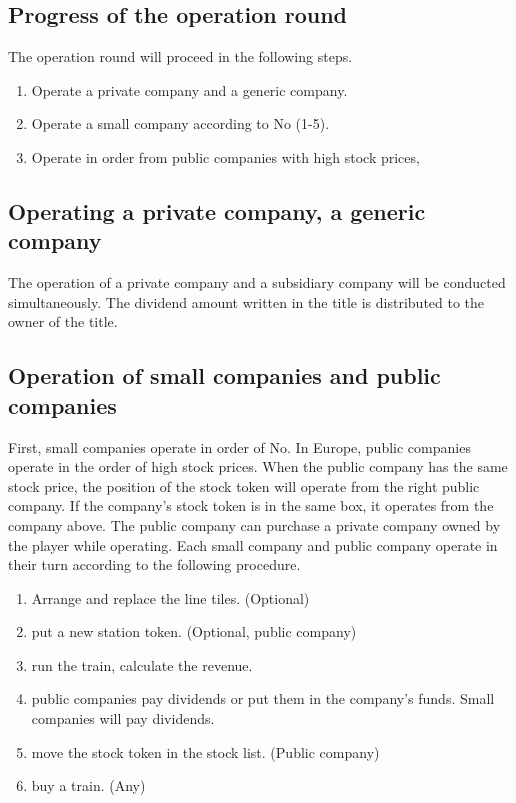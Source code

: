 \documentclass{article}
\begin{document}
\begin{CJK}{UTF8}{min}
\subsection{Progress of the operation round}
The operation round will proceed in the following steps.
\begin{enumerate}
\item Operate a private company and a generic company.
\item Operate a small company according to No (1-5).
\item Operate in order from public companies with high stock prices,
\end{enumerate}

\subsection{Operating a private company, a generic company}
The operation of a private company and a subsidiary company will be
conducted simultaneously. The dividend amount written in the title is
distributed to the owner of the title.

\subsection{Operation of small companies and public companies}
First, small companies operate in order of No. In Europe, public
companies operate in the order of high stock prices. When the public
company has the same stock price, the position of the stock token will
operate from the right public company. If the company's stock token is
in the same box, it operates from the company above. The public
company can purchase a private company owned by the player while
operating. Each small company and public company operate in their turn
according to the following procedure.
\begin{enumerate}
\item Arrange and replace the line tiles. (Optional)
\item put a new station token. (Optional, public company)
\item run the train, calculate the revenue.
\item public companies pay dividends or put them in the company's
  funds. Small companies will pay dividends.
\item move the stock token in the stock list. (Public company)
\item buy a train. (Any)
\end{enumerate}


\end{CJK}
\end{document}
